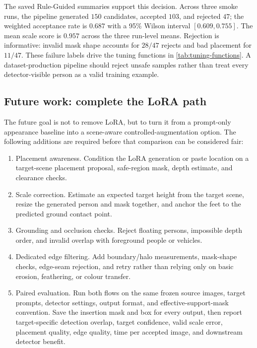\documentclass[11pt,a4paper]{article}
\begin{document}
The saved Rule-Guided summaries support this decision. Across three smoke runs, the pipeline generated $150$ candidates, accepted $103$, and rejected $47$; the weighted acceptance rate is $0.687$ with a 95\% Wilson interval $[0.609,0.755]$. The mean scale score is $0.957$ across the three run-level means. Rejection is informative: invalid mask shape accounts for $28/47$ rejects and bad placement for $11/47$. These failure labels drive the tuning functions in \cref{tab:tuning-functions}. A dataset-production pipeline should reject unsafe samples rather than treat every detector-visible person as a valid training example.

\subsection{Future work: complete the LoRA path}\label{sec:futurework}
The future goal is not to remove LoRA, but to turn it from a prompt-only appearance baseline into a scene-aware controlled-augmentation option. The following additions are required before that comparison can be considered fair:
\begin{enumerate}[leftmargin=1.8em,itemsep=3pt]
  \item Placement awareness. Condition the LoRA generation or paste location on a target-scene placement proposal, safe-region mask, depth estimate, and clearance checks.
  \item Scale correction. Estimate an expected target height from the target scene, resize the generated person and mask together, and anchor the feet to the predicted ground contact point.
  \item Grounding and occlusion checks. Reject floating persons, impossible depth order, and invalid overlap with foreground people or vehicles.
  \item Dedicated edge filtering. Add boundary/halo measurements, mask-shape checks, edge-seam rejection, and retry rather than relying only on basic erosion, feathering, or colour transfer.
  \item Paired evaluation. Run both flows on the same frozen source images, target prompts, detector settings, output format, and effective-support-mask convention. Save the insertion mask and box for every output, then report target-specific detection overlap, target confidence, valid scale error, placement quality, edge quality, time per accepted image, and downstream detector benefit.
\end{enumerate}
\end{document}
